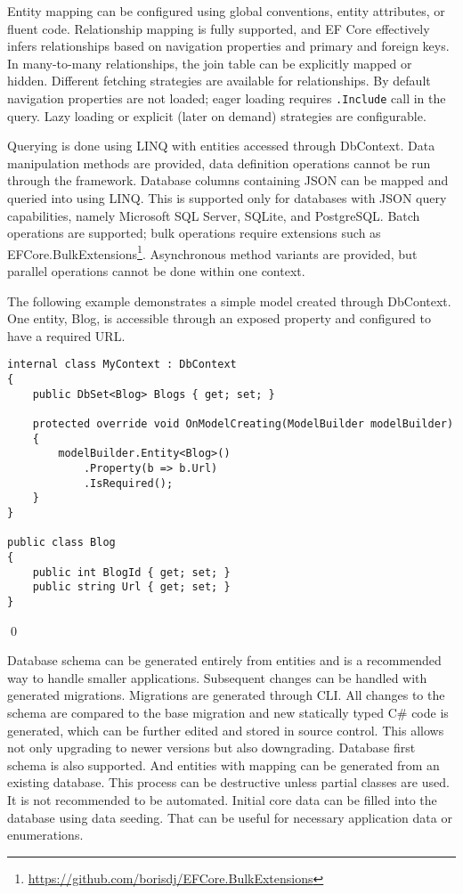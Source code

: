 Entity mapping can be configured using global conventions, entity attributes, or fluent code. Relationship mapping is fully supported, and EF Core effectively infers relationships based on navigation properties and primary and foreign keys. In many-to-many relationships, the join table can be explicitly mapped or hidden. Different fetching strategies are available for relationships. By default navigation properties are not loaded; eager loading requires \texttt{.Include} call in the query. Lazy loading or explicit (later on demand) strategies are configurable. 

Querying is done using LINQ with entities accessed through DbContext. Data manipulation methods are provided, data definition operations cannot be run through the framework. Database columns containing JSON can be mapped and queried into using LINQ. This is supported only for databases with JSON query capabilities, namely Microsoft SQL Server, SQLite, and PostgreSQL. Batch operations are supported; bulk operations require extensions such as EFCore.BulkExtensions\footnote{\url{https://github.com/borisdj/EFCore.BulkExtensions}}. Asynchronous method variants are provided, but parallel operations cannot be done within one context.

\begin{example}
\small
The following example\cite{efcore} demonstrates a simple model created through DbContext. One entity, Blog, is accessible through an exposed property and configured to have a required URL.

\begin{lstlisting}[language=CSharp]
internal class MyContext : DbContext
{
    public DbSet<Blog> Blogs { get; set; }

    protected override void OnModelCreating(ModelBuilder modelBuilder)
    {
        modelBuilder.Entity<Blog>()
            .Property(b => b.Url)
            .IsRequired();
    }
}

public class Blog
{
    public int BlogId { get; set; }
    public string Url { get; set; }
}
\end{lstlisting}
\qed
\end{example}

Database schema can be generated entirely from entities and is a recommended way to handle smaller applications. Subsequent changes can be handled with generated migrations. Migrations are generated through CLI. All changes to the schema are compared to the base migration and new statically typed C\# code is generated, which can be further edited and stored in source control. This allows not only upgrading to newer versions but also downgrading. Database first schema is also supported. And entities with mapping can be generated from an existing database. This process can be destructive unless partial classes are used. It is not recommended to be automated. Initial core data can be filled into the database using data seeding. That can be useful for necessary application data or enumerations.


